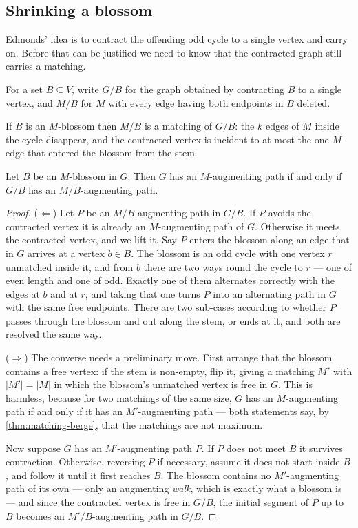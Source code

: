 \subsection{Shrinking a blossom}
\label{sec:matching-shrinking}

Edmonds' idea is to contract the offending odd cycle to a single vertex and
carry on. Before that can be justified we need to know that the contracted
graph still carries a matching.

\begin{definition}
For a set $B \subseteq V$, write $G/B$ for the graph obtained by contracting $B$
to a single vertex, and $M/B$ for $M$ with every edge having both endpoints in
$B$ deleted.
\end{definition}

If $B$ is an $M$-blossom then $M/B$ is a matching of $G/B$: the $k$ edges of $M$
inside the cycle disappear, and the contracted vertex is incident to at most the
one $M$-edge that entered the blossom from the stem.

\begin{theorem}\label{thm:matching-blossom}
Let $B$ be an $M$-blossom in $G$. Then $G$ has an $M$-augmenting path if and
only if $G/B$ has an $M/B$-augmenting path.
\end{theorem}

\begin{proof}
($\Leftarrow$) Let $P$ be an $M/B$-augmenting path in $G/B$. If $P$ avoids the
contracted vertex it is already an $M$-augmenting path of $G$. Otherwise it
meets the contracted vertex, and we lift it. Say $P$ enters the blossom along an
edge that in $G$ arrives at a vertex $b \in B$. The blossom is an odd cycle with
one vertex $r$ unmatched inside it, and from $b$ there are two ways round the
cycle to $r$ --- one of even length and one of odd. Exactly one of them
alternates correctly with the edges at $b$ and at $r$, and taking that one turns
$P$ into an alternating path in $G$ with the same free endpoints. There are two
sub-cases according to whether $P$ passes through the blossom and out along the
stem, or ends at it, and both are resolved the same way.

($\Rightarrow$) The converse needs a preliminary move. First arrange that the
blossom contains a free vertex: if the stem is non-empty, flip it, giving a
matching $M'$ with $|M'| = |M|$ in which the blossom's unmatched vertex is free
in $G$. This is harmless, because for two matchings of the same size, $G$ has an
$M$-augmenting path if and only if it has an $M'$-augmenting path --- both
statements say, by \cref{thm:matching-berge}, that the matchings are not
maximum.

Now suppose $G$ has an $M'$-augmenting path $P$. If $P$ does not meet $B$ it
survives contraction. Otherwise, reversing $P$ if necessary, assume it does not
start inside $B$, and follow it until it first reaches $B$. The blossom contains
no $M'$-augmenting path of its own --- only an augmenting \emph{walk}, which is
exactly what a blossom is --- and since the contracted vertex is free in
$G/B$, the initial segment of $P$ up to $B$ becomes an $M'/B$-augmenting path in
$G/B$.
\end{proof}


